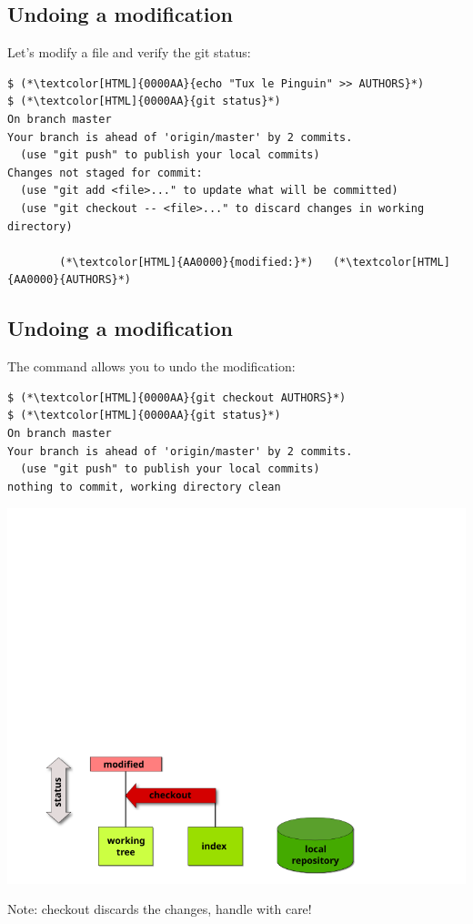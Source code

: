 \subsection{Undoing a modification}
\begin{frame}[fragile]
\subslidetitle

  Let's modify a file and verify the git status:
  \begin{lstlisting}
$ (*\textcolor[HTML]{0000AA}{echo "Tux le Pinguin" >> AUTHORS}*)
$ (*\textcolor[HTML]{0000AA}{git status}*)
On branch master
Your branch is ahead of 'origin/master' by 2 commits.
  (use "git push" to publish your local commits)
Changes not staged for commit:
  (use "git add <file>..." to update what will be committed)
  (use "git checkout -- <file>..." to discard changes in working directory)

        (*\textcolor[HTML]{AA0000}{modified:}*)   (*\textcolor[HTML]{AA0000}{AUTHORS}*)

\end{lstlisting}

\end{frame}

\subsection{Undoing a modification}
\begin{frame}[fragile]
\subslidetitle
  The command  allows you to undo the modification:
  \begin{lstlisting}
$ (*\textcolor[HTML]{0000AA}{git checkout AUTHORS}*)
$ (*\textcolor[HTML]{0000AA}{git status}*)
On branch master
Your branch is ahead of 'origin/master' by 2 commits.
  (use "git push" to publish your local commits)
nothing to commit, working directory clean
\end{lstlisting}

  \vspace{1em}
  \centerline{\includegraphics{diagrams/undo-modified}}

  \vspace{1em}
  Note: checkout discards the changes, handle with care!
\end{frame}

